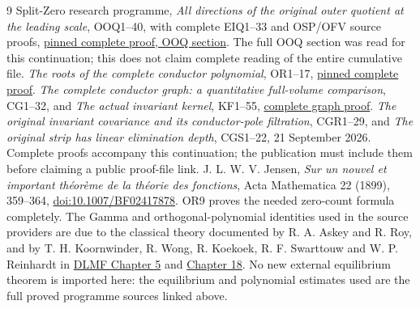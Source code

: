\documentclass[11pt]{article}
\begin{document}
\begin{thebibliography}{9}
 Split-Zero research programme,
\emph{All directions of the original outer quotient at the leading scale},
OOQ1--40, with complete EIQ1--33 and OSP/OFV source proofs,
\href{https://github.com/KokunoYumeto/zeta-function-research-reader/blob/5992ad50c0f2a06921f1fcaded7b4e38097c0739/workbenches/splitzero-tandem/continuations/20260920-original-kernel-mixed-determinants/providers/09_INPUT_CUMULATIVE_PROOFS.tex#L23179}{pinned complete proof, OOQ section}.
The full OOQ section was read for this continuation; this does not
claim complete reading of the entire cumulative file.
 \emph{The roots of the complete conductor polynomial},
OR1--17,
\href{https://github.com/KokunoYumeto/zeta-function-research-reader/blob/0fd693c844aad9117e30ec447c59864a28af10f3/workbenches/splitzero-tandem/continuations/20260921-native-spectral-real-pair/003/COMPLETE_CONDUCTOR_ROOT_GEOMETRY.tex#L38}{pinned complete proof}.
 \emph{The complete conductor graph: a quantitative full-volume
comparison}, CG1--32, and \emph{The actual invariant kernel}, KF1--55,
\href{https://github.com/KokunoYumeto/zeta-function-research-reader/blob/0fd693c844aad9117e30ec447c59864a28af10f3/workbenches/splitzero-tandem/continuations/20260921-native-spectral-real-pair/003/COMPLETE_CONDUCTOR_GRAPH_METRIC.tex}{complete graph proof}.
 \emph{The original invariant covariance and its conductor-pole
filtration}, CGR1--29, and \emph{The original strip has linear
elimination depth}, CGS1--22, 21 September 2026.
Complete proofs accompany this continuation; the publication must
include them before claiming a public proof-file link.
 J. L. W. V. Jensen,
\emph{Sur un nouvel et important th\'eor\`eme de la th\'eorie des fonctions},
Acta Mathematica 22 (1899), 359--364,
\href{https://doi.org/10.1007/BF02417878}{doi:10.1007/BF02417878}.
OR9 proves the needed zero-count formula completely.
The Gamma and orthogonal-polynomial identities used in the source
providers are due to the classical theory documented by R. A. Askey
and R. Roy, and by T. H. Koornwinder, R. Wong, R. Koekoek,
R. F. Swarttouw and W. P. Reinhardt in
\href{https://dlmf.nist.gov/5}{DLMF Chapter 5} and
\href{https://dlmf.nist.gov/18}{Chapter 18}.
No new external equilibrium theorem is imported here: the
equilibrium and polynomial estimates used are the full proved
programme sources linked above.
\end{thebibliography}
\end{document}
